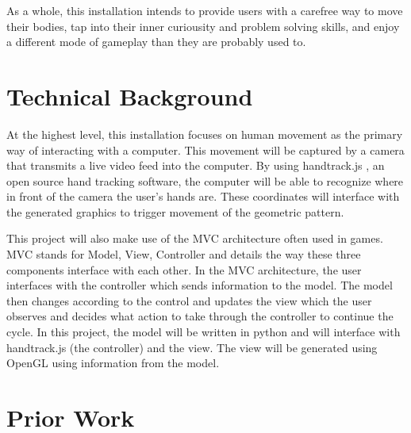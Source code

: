 \documentclass[10pt,twocolumn]{article}
\begin{document}
As a whole, this installation intends to provide users with a carefree way to move their bodies, tap into their inner curiousity and problem solving skills, and enjoy a different mode of gameplay than they are probably used to. 


\section{Technical Background}

At the highest level, this installation focuses on human movement as the primary way of interacting with a computer.  This movement will be captured by a camera that transmits a live video feed into the computer.  By using handtrack.js \cite{handTrack.js_Dibia2017}, an open source hand tracking software, the computer will be able to recognize where in front of the camera the user's hands are.  These coordinates will interface with the generated graphics to trigger movement of the geometric pattern.  

This project will also make use of the MVC architecture often used in games.  MVC stands for Model, View, Controller and details the way these three components interface with each other. In the MVC architecture, the user interfaces with the controller which sends information to the model.  The model then changes according to the control and updates the view which the user observes and decides what action to take through the controller to continue the cycle. In this project, the model will be written in python and will interface with handtrack.js (the controller) and the view.  The view will be generated using OpenGL using information from the model.  


\section{Prior Work}
\end{document}
